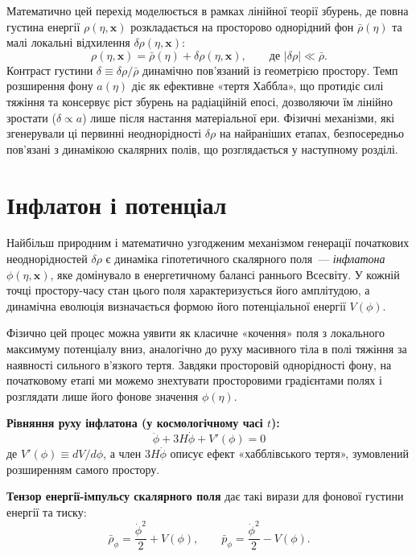\documentclass[12pt, a4paper]{article}
\begin{document}
Математично цей перехід моделюється в рамках лінійної теорії збурень, де повна густина енергії $\rho(\eta, \mathbf{x})$ розкладається на просторово однорідний фон $\bar{\rho}(\eta)$ та малі локальні відхилення $\delta\rho(\eta, \mathbf{x})$:
\begin{equation*}
  \rho(\eta, \mathbf{x}) = \bar{\rho}(\eta) + \delta\rho(\eta, \mathbf{x}),
  \qquad \text{де } |\delta\rho| \ll \bar{\rho}.
\end{equation*}
Контраст густини $\delta \equiv \delta\rho / \bar{\rho}$ динамічно пов'язаний із геометрією простору. Темп розширення фону $a(\eta)$ діє як ефективне «тертя Хаббла», що протидіє силі тяжіння та консервує ріст збурень на радіаційній епосі, дозволяючи їм лінійно зростати ($\delta \propto a$) лише після настання матеріальної ери. Фізичні механізми, які згенерували ці первинні неоднорідності $\delta\rho$ на найраніших етапах, безпосередньо пов'язані з динамікою скалярних полів, що розглядається у наступному розділі.

\section{Інфлатон і потенціал}

Найбільш природним і математично узгодженим механізмом генерації початкових неоднорідностей $\delta\rho$ є динаміка гіпотетичного скалярного поля~--- \emph{інфлатона} $\phi(\eta, \mathbf{x})$, яке домінувало в енергетичному балансі раннього Всесвіту. У кожній точці простору-часу стан цього поля характеризується його амплітудою, а динамічна еволюція визначається формою його потенціальної енергії $V(\phi)$.

Фізично цей процес можна уявити як класичне «кочення» поля з локального максимуму потенціалу вниз, аналогічно до руху масивного тіла в полі тяжіння за наявності сильного в'язкого тертя. Завдяки просторовій однорідності фону, на початковому етапі ми можемо знехтувати просторовими градієнтами полях і розглядати лише його фонове значення $\phi(\eta)$.

\begin{keybox}
\textbf{Рівняння руху інфлатона (у космологічному часі $t$):}
\begin{equation}\label{eq:klein_gordon}
  \ddot{\phi} + 3H\dot{\phi} + V'(\phi) = 0
\end{equation}
де $V'(\phi) \equiv dV/d\phi$, а член $3H\dot{\phi}$ описує ефект «хабблівського тертя», зумовлений розширенням самого простору.

\textbf{Тензор енергії-імпульсу скалярного поля} дає такі вирази для фонової густини енергії та тиску:
\begin{equation}\label{eq:inflaton_rho_p}
  \bar{\rho}_\phi = \frac{\dot{\phi}^2}{2} + V(\phi), \qquad \bar{p}_\phi = \frac{\dot{\phi}^2}{2} - V(\phi).
\end{equation}
\end{keybox}
\end{document}
